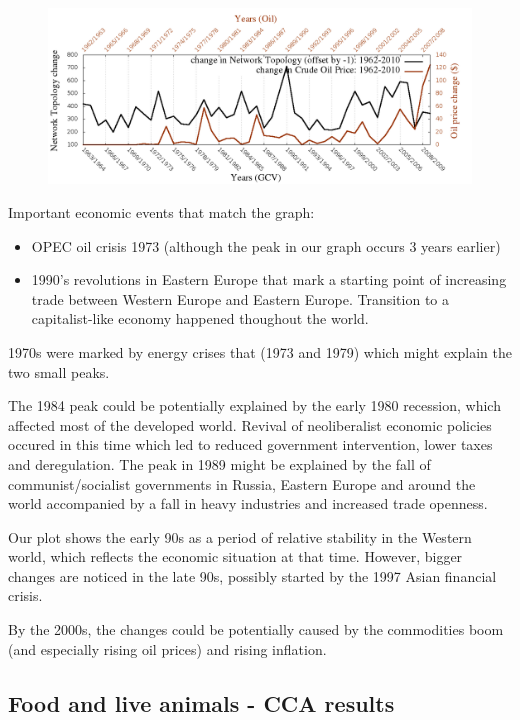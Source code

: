 \documentclass[11pt,a4paper,oneside]{report}
\begin{document}
\begin{figure}[H]
  \centering
\includegraphics[scale=0.4]
{../code/final_results_norm1/all_trade_thresh/change_over_time.png}
\caption{}
\label{fig:hsa_meta}
\end{figure}

Important economic events that match the graph:
\begin{itemize}
 \item OPEC oil crisis 1973 (although the peak in our graph occurs 3 years earlier)
 \item 1990's revolutions in Eastern Europe that mark a starting point of 
 increasing trade between Western Europe and Eastern Europe. Transition to a capitalist-like economy happened thoughout the world.
\end{itemize}

1970s were marked by energy crises that (1973 and 1979) which might explain the two small peaks. 

The 1984 peak could be potentially explained by the early 1980 recession, which affected most of the developed world. Revival of neoliberalist economic policies occured in this time which led to reduced government intervention, lower taxes and deregulation. The peak in 1989 might be explained by the fall of communist/socialist governments in Russia, Eastern Europe and around the world accompanied by a fall in heavy industries and increased trade openness.

Our plot shows the early 90s as a period of relative stability in the Western world, which reflects the economic situation at that time. However, bigger changes are noticed in the late 90s, possibly started by the 1997 Asian financial crisis. 

By the 2000s, the changes could be potentially caused by the commodities boom (and especially rising oil prices) and rising inflation. 

\subsection*{Food and live animals - CCA results}
\end{document}
